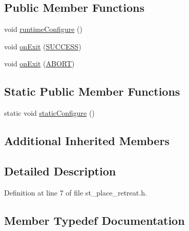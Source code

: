 \subsection*{Public Member Functions}
\begin{DoxyCompactItemize}
\item 
void \hyperlink{structsm__fetch__two__table__whiskey__pour_1_1StPlaceRetreat_abbc1aebc1a9b8687e0a8e7c74c908704}{runtime\+Configure} ()
\item 
void \hyperlink{structsm__fetch__two__table__whiskey__pour_1_1StPlaceRetreat_a89197ffd2fe8d2fe2ca09502b0c13bbc}{on\+Exit} (\hyperlink{structsmacc_1_1default__transition__tags_1_1SUCCESS}{S\+U\+C\+C\+E\+SS})
\item 
void \hyperlink{structsm__fetch__two__table__whiskey__pour_1_1StPlaceRetreat_a9e172773e61deb7aa4749df7ef114d3f}{on\+Exit} (\hyperlink{structsmacc_1_1default__transition__tags_1_1ABORT}{A\+B\+O\+RT})
\end{DoxyCompactItemize}
\subsection*{Static Public Member Functions}
\begin{DoxyCompactItemize}
\item 
static void \hyperlink{structsm__fetch__two__table__whiskey__pour_1_1StPlaceRetreat_a95bfe66cb369b88bb3a8a3c374ef6157}{static\+Configure} ()
\end{DoxyCompactItemize}
\subsection*{Additional Inherited Members}


\subsection{Detailed Description}


Definition at line 7 of file st\+\_\+place\+\_\+retreat.\+h.



\subsection{Member Typedef Documentation}
\mbox{\label{structsm__fetch__two__table__whiskey__pour_1_1StPlaceRetreat_ac25d5417461c2afbf484e23c05eaa058}} 
